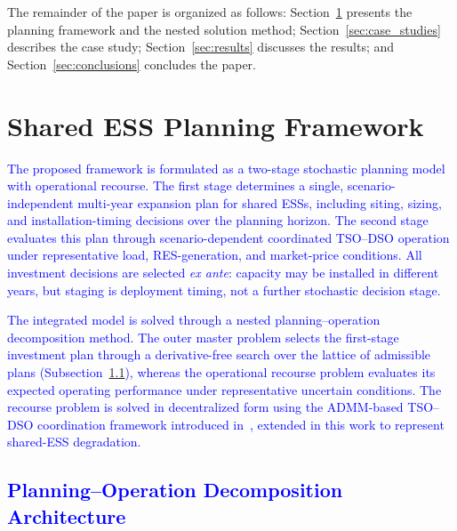 \documentclass[preprint,12pt]{elsarticle}
\begin{document}
The remainder of the paper is organized as follows:
Section~\ref{sec:methodology} presents the planning framework and the nested solution method;
Section~\ref{sec:case_studies} describes the case study;
Section~\ref{sec:results} discusses the results; and
Section~\ref{sec:conclusions} concludes the paper.

\section{Shared ESS Planning Framework}
\label{sec:methodology}

\textcolor{blue}{
    The proposed framework is formulated as a two-stage stochastic planning model with operational recourse. The first stage determines a single, scenario-independent multi-year expansion plan for shared ESSs, including siting, sizing, and installation-timing decisions over the planning horizon. The second stage evaluates this plan through scenario-dependent coordinated TSO–DSO operation under representative load, RES-generation, and market-price conditions. All investment decisions are selected \textit{ex ante}: capacity may be installed in different years, but staging is deployment timing, not a further stochastic decision stage.
}

\textcolor{blue}{
    The integrated model is solved through a nested planning–operation decomposition method. The outer master problem selects the first-stage investment plan through a derivative-free search over the lattice of admissible plans (Subsection~\ref{subsec:architecture}), whereas the operational recourse problem evaluates its expected operating performance under representative uncertain conditions. The recourse problem is solved in decentralized form using the ADMM-based TSO–DSO coordination framework introduced in~\cite{simoes_2023}, extended in this work to represent shared-ESS degradation. %
}

\subsection{\textcolor{blue}{Planning--Operation Decomposition Architecture}}
\label{subsec:architecture}
\end{document}
